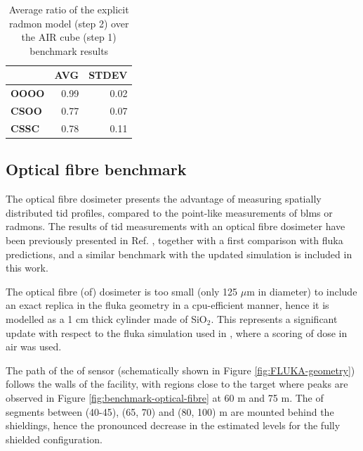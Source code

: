 \documentclass[encoding=utf8,british]{tumphthesis}
\begin{document}
\begin{table}[h]
\centering
\caption{Average ratio of the explicit \acrshort{radmon} model (step 2) over the AIR cube (step 1) benchmark results}
\label{tab:CHARM-benchmark-radmon-tid-shielding-results}
\begin{tabular}{|l|r|r|}
\hline
\rowcolor[HTML]{CFE2F3} 
              & \multicolumn{1}{l}{\cellcolor[HTML]{CFE2F3}\textbf{AVG}} & \multicolumn{1}{l}{\cellcolor[HTML]{CFE2F3}\textbf{STDEV}} \\ \hline
\textbf{OOOO} & 0.99                                                     & 0.02                                                       \\
\rowcolor[HTML]{CFE2F3} 
\textbf{CSOO} & 0.77                                            & 0.07                                              \\
\textbf{CSSC} & 0.78                                                     & 0.11 \\ \hline
\end{tabular}
\end{table}


\subsection{Optical fibre benchmark}
\label{subsection:CHARM-benchmark-OF}

The optical fibre dosimeter presents the advantage of measuring spatially distributed \acrshort{tid} profiles, compared to the point-like measurements of \acrshort{blm}s or \acrshort{radmon}s. The results of \acrshort{tid} measurements with an optical fibre dosimeter have been previously presented in Ref. \cite{Diego:OF}, together with a first comparison with \acrshort{fluka} predictions, and a similar benchmark with the updated simulation is included in this work.

The optical fibre (\acrshort{of}) dosimeter is too small (only 125 $\mu$m in diameter) to include an exact replica in the \acrshort{fluka} geometry in a \acrshort{cpu}-efficient manner, hence it is modelled as a 1 cm thick cylinder made of SiO$_{2}$. This represents a significant update with respect to the \acrshort{fluka} simulation used in \cite{Diego:OF}, where a scoring of dose in air was used.

The path of the  \acrshort{of} sensor (schematically shown in Figure \ref{fig:FLUKA-geometry}) follows the walls of the facility, with regions close to the target where peaks are observed in Figure \ref{fig:benchmark-optical-fibre} at 60 m and 75 m. The  \acrshort{of} segments between (40-45), (65, 70) and (80, 100) m are mounted behind the shieldings, hence the pronounced decrease in the estimated levels for the fully shielded configuration.
\end{document}
